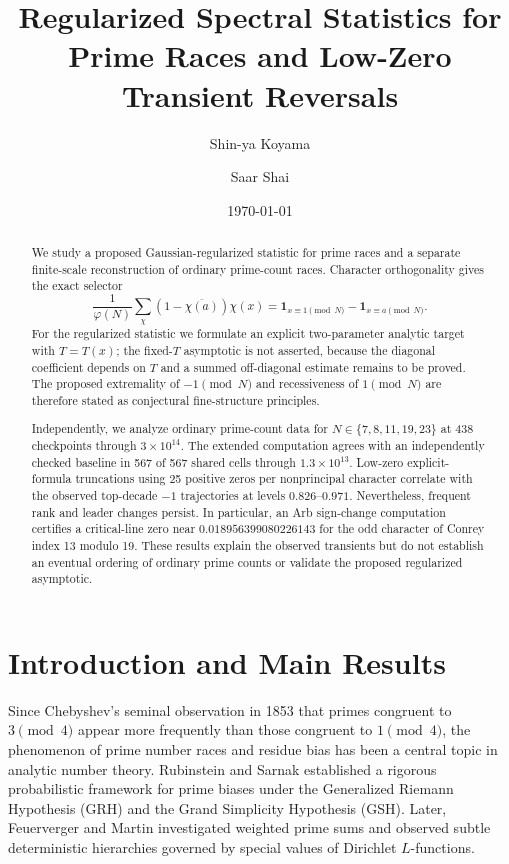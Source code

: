 \documentclass[12pt,reqno]{amsart}
\title[Regularized Prime-Race Statistics]{Regularized Spectral Statistics for Prime Races and Low-Zero Transient Reversals}
\author{Shin-ya Koyama}
\author{Saar Shai}
\date{\today}
\theoremstyle{definition}
\theoremstyle{remark}
\numberwithin{equation}{section}
\begin{document}
\begin{abstract}
We study a proposed Gaussian-regularized statistic for prime races and a
separate finite-scale reconstruction of ordinary prime-count races.  Character
orthogonality gives the exact selector
\[
 \frac1{\varphi(N)}\sum_\chi(1-\overline{\chi(a)})\chi(x)
 =\mathbf 1_{x\equiv1\pmod N}-\mathbf 1_{x\equiv a\pmod N}.
\]
For the regularized statistic we formulate an explicit two-parameter analytic
target with $T=T(x)$; the fixed-$T$ asymptotic is not asserted, because the
diagonal coefficient depends on $T$ and a summed off-diagonal estimate remains
to be proved.  The proposed extremality of $-1\pmod N$ and recessiveness of
$1\pmod N$ are therefore stated as conjectural fine-structure principles.

Independently, we analyze ordinary prime-count data for
$N\in\{7,8,11,19,23\}$ at 438 checkpoints through $3\times10^{14}$.
The extended computation agrees with an independently checked baseline in
567 of 567 shared cells through $1.3\times10^{13}$.  Low-zero explicit-formula
truncations using 25 positive zeros per nonprincipal character correlate with
the observed top-decade $-1$ trajectories at levels $0.826$--$0.971$.
Nevertheless, frequent rank and leader changes persist.  In particular, an
Arb sign-change computation certifies a critical-line zero near
$0.018956399080226143$ for the odd character of Conrey index 13 modulo 19.
These results explain the observed transients but do not establish an eventual
ordering of ordinary prime counts or validate the proposed regularized
asymptotic.
\end{abstract}

\maketitle

\section{Introduction and Main Results}

Since Chebyshev's seminal observation in 1853 that primes congruent to $3 \pmod 4$ appear more frequently than those congruent to $1 \pmod 4$, the phenomenon of prime number races and residue bias has been a central topic in analytic number theory. Rubinstein and Sarnak \cite{RS94} established a rigorous probabilistic framework for prime biases under the Generalized Riemann Hypothesis (GRH) and the Grand Simplicity Hypothesis (GSH). Later, Feuerverger and Martin \cite{FM00} investigated weighted prime sums and observed subtle deterministic hierarchies governed by special values of Dirichlet $L$-functions.
\end{document}
